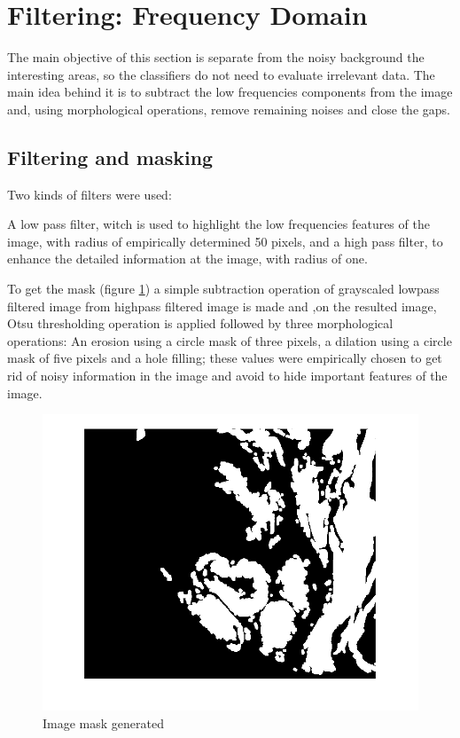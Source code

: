 \documentclass[conference]{IEEEtran}
\begin{document}
	\section{Filtering: Frequency Domain}
		\par The main objective of this section is separate from the noisy background the interesting areas, so the classifiers do not need to evaluate irrelevant data.
		The main idea behind it is to subtract the low frequencies components from the image and, using morphological operations, remove remaining noises and close the gaps.
		\subsection{Filtering and masking}
			Two kinds of filters were used:
			\par A low pass filter, witch is used to highlight the low frequencies features of the image, with radius of  empirically determined 50 pixels, and a high pass filter, to enhance the detailed information at the image, with  radius of one.
			
			\par To get the mask (figure \ref{fig:mask}) a simple subtraction operation of grayscaled lowpass filtered image from highpass filtered image is made and ,on the resulted image, Otsu thresholding operation is applied followed by three morphological operations: An erosion using a circle mask of three pixels, a dilation using a circle mask of five pixels and a hole filling; these values were empirically chosen to get rid of noisy information in the image and avoid to hide important features of the image.
			
			\begin{figure}[h]
				\centering
				\includegraphics[width=0.7\linewidth]{images/fourrierFiltering/mask}
				\caption{Image mask generated}
				\label{fig:mask}
			\end{figure}
		
\end{document}
